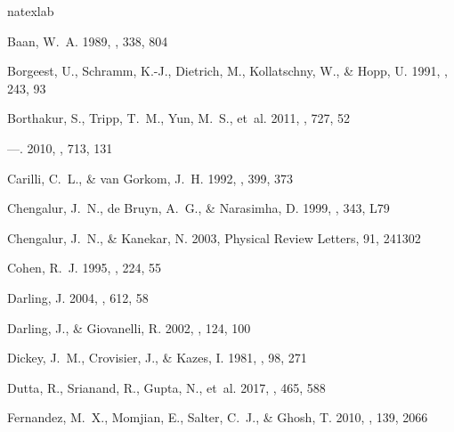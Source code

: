 \documentclass[iop,apjl,numberedappendix,appendixfloats,twocolappendix,revtex4]{emulateapj}
\begin{document}
\begin{thebibliography}{}
\expandafter\ifx\csname natexlab\endcsname\relax\def\natexlab#1{#1}\fi
\providecommand{\url}[1]{\href{#1}{#1}}

{Baan}, W.~A. 1989, \apj, 338, 804

{Borgeest}, U., {Schramm}, K.-J., {Dietrich}, M., {Kollatschny}, W., \& {Hopp},
  U. 1991, \aap, 243, 93

{Borthakur}, S., {Tripp}, T.~M., {Yun}, M.~S., {et~al.} 2011, \apj, 727, 52

---. 2010, \apj, 713, 131

{Carilli}, C.~L., \& {van Gorkom}, J.~H. 1992, \apj, 399, 373

{Chengalur}, J.~N., {de Bruyn}, A.~G., \& {Narasimha}, D. 1999, \aap, 343, L79

{Chengalur}, J.~N., \& {Kanekar}, N. 2003, Physical Review Letters, 91, 241302

{Cohen}, R.~J. 1995, \apss, 224, 55

{Darling}, J. 2004, \apj, 612, 58

{Darling}, J., \& {Giovanelli}, R. 2002, \aj, 124, 100

{Dickey}, J.~M., {Crovisier}, J., \& {Kazes}, I. 1981, \aap, 98, 271

{Dutta}, R., {Srianand}, R., {Gupta}, N., {et~al.} 2017, \mnras, 465, 588

{Fernandez}, M.~X., {Momjian}, E., {Salter}, C.~J., \& {Ghosh}, T. 2010, \aj,
  139, 2066


\end{thebibliography}
\end{document}
